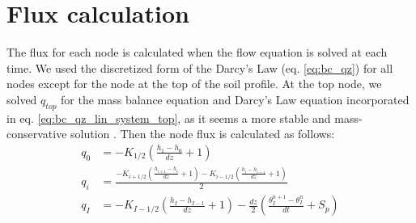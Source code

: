 \documentclass[a4paper,12pt]{article}
\begin{document}
\section{Flux calculation}
The flux for each node is calculated  when the flow equation is solved at each time. We used the discretized form of the Darcy's Law (eq. \ref{eq:bc_qz}) for all nodes except for the node at the top of the soil profile. At the top node, we solved $q_{top}$ for the mass balance equation and Darcy's Law equation incorporated in eq. \ref{eq:bc_qz_lin_system_top}, as it seems a more stable and mass-conservative solution \citep{Hydrus1d}. Then the node flux is calculated as follows:
\begin{align} \label{eq:flux}
	q_0 &=-K_{1/2}\left(\frac{h_1-h_0}{dz}+1 \right) \nonumber \\
	q_i &=\frac{-K_{i+1/2}\left(\frac{h_{i+1}-h_i}{dz}+1 \right)-K_{i-1/2}\left(\frac{h_{i}-h_{i-1}}{dz}+1 \right)}{2} \\
	q_I &=-K_{I-1/2}\left(\frac{h_{I}-h_{I-1}}{dz}+1 \right)-\frac{dz}{2}\left(\frac{\theta_I^{n+1}-\theta_I^{n}}{dt}+S_p \right) \nonumber
\end{align}
\end{document}
